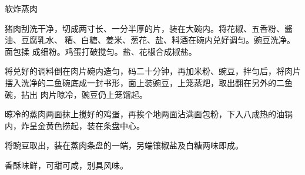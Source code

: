 %
%
%
%
%
%
%
\begin{recipe}{软炸蒸肉}

\ingredients


\preparation

\step 猪肉刮洗干净，切成两寸长、一分半厚的片，装在大碗内。将花椒、五香粉、酱
油、豆腐乳水、𰪿糟、白糖、姜米、葱花、盐、料酒在碗内兑好调匀。豌豆洗净。面包揉
成细粉。鸡蛋打破搅匀。盐、花椒合成椒盐。

\step 将兑好的调料倒在肉片碗内造匀，码二十分钟，再加米粉、豌豆，拌匀后，将肉片
摆入洗净的二鱼碗底成一封书形，面上装豌豆，上笼蒸𤆵，取出翻在另外的二鱼碗，拈出
肉片晾冷，豌豆仍上笼馏起。

\step 晾冷的蒸肉两面抹上搅好的鸡蛋，再挨个地两面沾满面包粉，下入八成热的油锅
内，炸呈金黄色捞起，装在条盘中心。

\step 将豌豆取出，装在蒸肉条盘的一端，另端镶椒盐及白糖两味即成。

\features

香酥味鲜，可甜可咸，别具风味。

\end{recipe}

